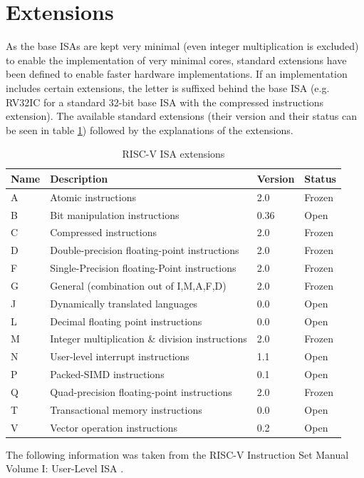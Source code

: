 \section{Extensions}
As the base ISAs are kept very minimal (even integer
multiplication is excluded) to enable the implementation
of very minimal cores, standard extensions have been defined to
enable faster hardware implementations.
If an implementation includes certain extensions, the letter is
suffixed behind the base ISA (e.g. RV32IC for a standard 32-bit
base ISA with the compressed instructions extension).
The available standard extensions (their version and their status
can be seen in table \ref{tab:risc-v_isa_extensions}) followed
by the explanations of the extensions.
\begin{table}
    \centering
    \begin{tabular}{|l|l|l|l|}
        \hline
        Name & Description & Version & Status \\ \hline
        A & Atomic instructions & 2.0 & Frozen \\ \hline
        B & Bit manipulation instructions  & 0.36 \cite{github_risc-v_b_extension_release} & Open \\ \hline
        C & Compressed instructions & 2.0 & Frozen \\ \hline
        D & Double-precision floating-point instructions & 2.0 & Frozen\\ \hline
        F & Single-Precision floating-Point instructions & 2.0 & Frozen \\ \hline
        G & General (combination out of I,M,A,F,D) & 2.0 & Frozen \\ \hline
        J & Dynamically translated languages & 0.0 & Open \\ \hline
        L & Decimal floating point instructions & 0.0 & Open \\ \hline
        M & Integer multiplication \& division instructions & 2.0 & Frozen \\ \hline
        N & User-level interrupt instructions & 1.1 & Open \\ \hline
        P & Packed-SIMD instructions & 0.1 & Open \\ \hline
        Q & Quad-precision floating-point instructions & 2.0 & Frozen \\ \hline
        T & Transactional memory instructions & 0.0 & Open \\ \hline
        V & Vector operation instructions & 0.2 & Open \\ \hline
    \end{tabular}
    \caption{RISC-V ISA extensions \cite[p.~i~\&~vi-viii]{risc-v_isa_manual_user_level}}
    \label{tab:risc-v_isa_extensions}
\end{table}
\newline
The following information was taken from the RISC-V Instruction Set Manual
Volume I: User-Level ISA \cite{risc-v_isa_manual_user_level}.

